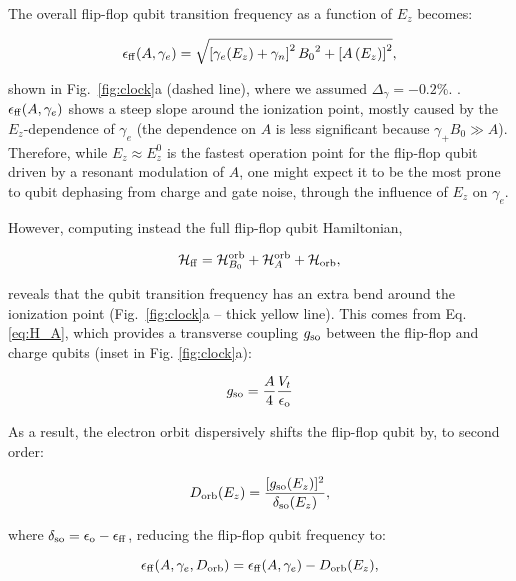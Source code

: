 \documentclass[aps,prb,superscriptaddress,nobibnotes,preprint]{revtex4-1}%
\begin{document}
The overall flip-flop qubit transition frequency as a function of $E_z$ becomes:

\begin{equation} \label{eq:e_ff_ge}
\epsilon_{\rm ff}(A,\gamma_e)=\sqrt{\left[\gamma_e(E_z)+\gamma_n\right]^2{B_0}^2+\left[A\left(E_z\right)\right]^2},
\end{equation}

shown in Fig.~\ref{fig:clock}a (dashed line), where we assumed $\Delta_\gamma=-0.2\%$. \cite{Rahman2009a}. $\epsilon_{\rm ff}(A,\gamma_e)$ shows a steep slope around the ionization point, mostly caused by the $E_z$-dependence of $\gamma_e$ (the dependence on $A$ is less significant because $\gamma_+B_0\gg A$). Therefore, while $E_z\approx E_z^0$ is the fastest operation point for the flip-flop qubit driven by a resonant modulation of $A$, one might expect it to be the most prone to qubit dephasing from charge and gate noise, through the influence of $E_z$ on $\gamma_e$.

However, computing instead the full flip-flop qubit Hamiltonian,

\begin{equation} \label{eq:H_ff_ge}
\mathcal{H}_{\rm ff} = \mathcal{H}_{B_0}^{\rm orb} +\mathcal{H}_{A}^{\rm orb} + \mathcal{H}_{\rm orb},
\end{equation}

reveals that the qubit transition frequency has an extra bend around the ionization point (Fig.~\ref{fig:clock}a -- thick yellow line). This comes from Eq. \ref{eq:H_A}, which provides a transverse coupling $g_{\rm so}$ between the flip-flop and charge qubits (inset in Fig. \ref{fig:clock}a):

\begin{equation} \label{eq:g_so}
g_{\rm so}=\frac{A}{4}\frac{V_t}{\epsilon_{\rm o}}
\end{equation}

As a result, the electron orbit dispersively shifts the flip-flop qubit by, to second order:

\begin{equation} \label{eq:Dorb}
D_{\rm orb}(E_z)=\frac{[g_{\rm so}(E_z)]^2}{\delta_{\rm so}(E_z)},
\end{equation}

where $\delta_{\rm so}=\epsilon_{\rm o} - \epsilon_{\rm ff}$, reducing the flip-flop qubit frequency to:

\begin{equation} \label{eq:e_ff_ge_Dorb}
\epsilon_{\rm ff}(A,\gamma_e,D_{\rm orb})=\epsilon_{\rm ff}(A,\gamma_e)-D_{\rm orb}(E_z),
\end{equation}
\end{document}
